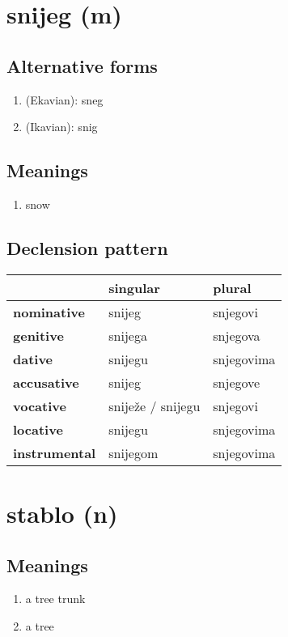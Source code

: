 \filbreak
\section{snijeg (m)}
\subsection*{Alternative forms}
\begin{enumerate}
\item (Ekavian): sneg
\item (Ikavian): snig
\end{enumerate}
\subsection*{Meanings}
\begin{enumerate}
\item snow
\end{enumerate}
\subsection*{Declension pattern}
\begin{tabularx}{\linewidth}{Xll}
\toprule
{} &           singular &      plural \\
\midrule
\textbf{nominative  } &             snijeg &    snjegovi \\
\textbf{genitive    } &            snijega &    snjegova \\
\textbf{dative      } &            snijegu &  snjegovima \\
\textbf{accusative  } &             snijeg &    snjegove \\
\textbf{vocative    } &  sniježe / snijegu &    snjegovi \\
\textbf{locative    } &            snijegu &  snjegovima \\
\textbf{instrumental} &           snijegom &  snjegovima \\
\bottomrule
\end{tabularx}

\filbreak
\section{stablo (n)}
\subsection*{Meanings}
\begin{enumerate}
\item a tree trunk
\item a tree
\end{enumerate}
